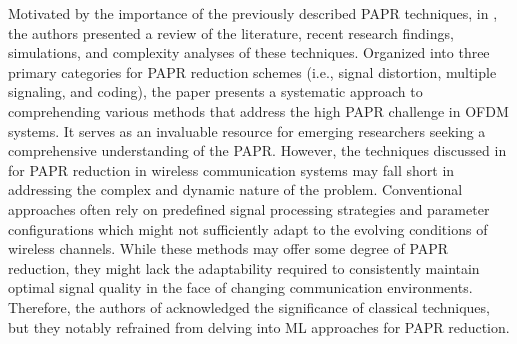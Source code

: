 \documentclass[conference]{IEEEtran}
\begin{document}
Motivated by the importance of the previously described PAPR techniques, in \cite{b50}, the authors presented a review of the literature, recent research findings, simulations, and complexity analyses of these techniques. Organized into three primary categories for PAPR reduction schemes (i.e., signal distortion, multiple signaling, and coding), the paper presents a systematic approach to comprehending various methods that address the high PAPR challenge in OFDM systems. It serves as an invaluable resource for emerging researchers seeking a comprehensive understanding of the PAPR. However, the techniques discussed in \cite{b50} for PAPR reduction in wireless communication systems may fall short in addressing the complex and dynamic nature of the problem. Conventional approaches often rely on predefined signal processing strategies and parameter configurations which might not sufficiently adapt to the evolving conditions of wireless channels. While these methods may offer some degree of PAPR reduction, they might lack the adaptability required to consistently maintain optimal signal quality in the face of changing communication environments. Therefore, the authors of \cite{b50} acknowledged the significance of classical techniques, but they notably refrained from delving into ML approaches for PAPR reduction.
\end{document}
